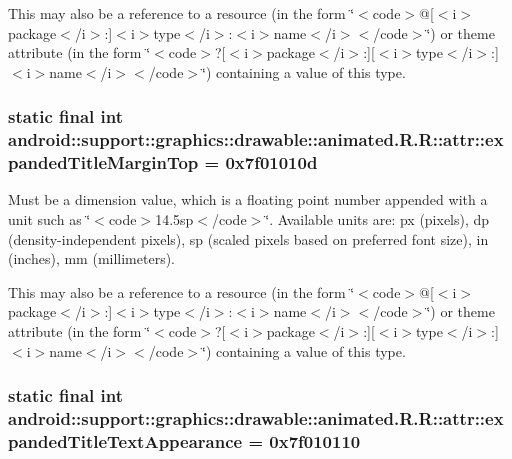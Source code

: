 This may also be a reference to a resource (in the form \char`\"{}$<$code$>$@\mbox{[}$<$i$>$package$<$/i$>$:\mbox{]}$<$i$>$type$<$/i$>$:$<$i$>$name$<$/i$>$$<$/code$>$\char`\"{}) or theme attribute (in the form \char`\"{}$<$code$>$?\mbox{[}$<$i$>$package$<$/i$>$:\mbox{]}\mbox{[}$<$i$>$type$<$/i$>$:\mbox{]}$<$i$>$name$<$/i$>$$<$/code$>$\char`\"{}) containing a value of this type. \hypertarget{classandroid_1_1support_1_1graphics_1_1drawable_1_1animated_1_1_r_1_1attr_c394754c8c50108d206d32f89c2a8083}{
\subsubsection[{expandedTitleMarginTop}]{\setlength{\rightskip}{0pt plus 5cm}static final int android::support::graphics::drawable::animated.R.R::attr::expandedTitleMarginTop = 0x7f01010d}}
\label{classandroid_1_1support_1_1graphics_1_1drawable_1_1animated_1_1_r_1_1attr_c394754c8c50108d206d32f89c2a8083}


Must be a dimension value, which is a floating point number appended with a unit such as \char`\"{}$<$code$>$14.5sp$<$/code$>$\char`\"{}. Available units are: px (pixels), dp (density-independent pixels), sp (scaled pixels based on preferred font size), in (inches), mm (millimeters). 

This may also be a reference to a resource (in the form \char`\"{}$<$code$>$@\mbox{[}$<$i$>$package$<$/i$>$:\mbox{]}$<$i$>$type$<$/i$>$:$<$i$>$name$<$/i$>$$<$/code$>$\char`\"{}) or theme attribute (in the form \char`\"{}$<$code$>$?\mbox{[}$<$i$>$package$<$/i$>$:\mbox{]}\mbox{[}$<$i$>$type$<$/i$>$:\mbox{]}$<$i$>$name$<$/i$>$$<$/code$>$\char`\"{}) containing a value of this type. \hypertarget{classandroid_1_1support_1_1graphics_1_1drawable_1_1animated_1_1_r_1_1attr_2c707d8c485857181a84c1b88a5f24bc}{
\subsubsection[{expandedTitleTextAppearance}]{\setlength{\rightskip}{0pt plus 5cm}static final int android::support::graphics::drawable::animated.R.R::attr::expandedTitleTextAppearance = 0x7f010110}}
\label{classandroid_1_1support_1_1graphics_1_1drawable_1_1animated_1_1_r_1_1attr_2c707d8c485857181a84c1b88a5f24bc}


